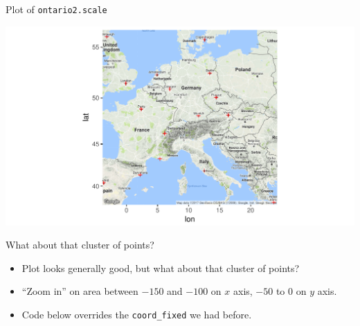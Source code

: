 \begin{frame}[fragile]{Plot of \texttt{ontario2.scale}}

\begin{knitrout}
\color{fgcolor}\begin{kframe}
\begin{alltt}
\end{alltt}
\end{kframe}
\includegraphics[width=\maxwidth]{figure/onnnscale-1} 

\end{knitrout}
  
   
\end{frame}

\begin{frame}[fragile]{What about that cluster of points?}

  \begin{itemize}
  \item Plot looks generally good, but what about that cluster of points?
  \item ``Zoom in'' on area between $-150$ and $-100$ on $x$ axis, $-50$ to 0 on
$y$ axis.
\item Code below overrides the \texttt{coord\_fixed} we had before.
  \end{itemize}


\begin{knitrout}
\color{fgcolor}\begin{kframe}
\begin{alltt}
\hlkwb{=}\hlopt{+}\hlstd{(}\hlstd{=}\hlstd{(}\hlopt{-}\hlstd{,}\hlopt{-}\hlstd{),}\hlstd{=}\hlstd{(}\hlopt{-}\hlstd{,}\hlstd{))}
\end{alltt}
\end{kframe}
\end{knitrout}

  
\end{frame}

